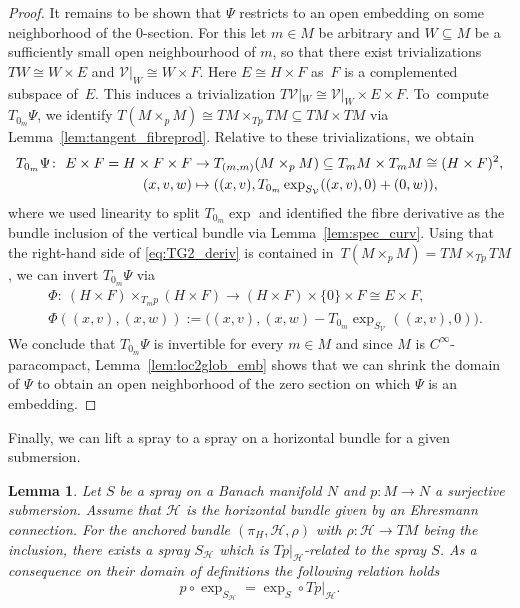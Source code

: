 \documentclass[pdftex]{sigma}
\numberwithin{equation}{section}
\newtheorem{Lemma}[Theorem]{Lemma}
\newcommand{\cH}{\ensuremath{\mathcal{H}}}
\newcommand{\cV}{\ensuremath{\mathcal{V}}}
\begin{document}
\begin{proof}
It remains to be shown that $\Psi$ restricts to an open embedding on some neighborhood of the $0$-section. For this let $m \in M$ be arbitrary and $W \subseteq M$ be a sufficiently small open neighbourhood of $m$, so that there exist trivializations $TW \cong W \times E$ and $\cV|_{W} \cong W \times F$. Here $E \cong H\times F$ as~$F$ is a complemented subspace of~$E$. This induces a trivialization $T\cV|_{W} \cong \cV|_{W} \times E \times F$. To~compute $T_{0_m}\Psi$, we identify $T(M\times_p M)\cong TM\times_{Tp} TM\subseteq TM \times TM$ via Lemma~\ref{lem:tangent_fibreprod}. Relative to these trivializations, we obtain
\begin{align}
 T_{0_{m}}\Psi\colon\ E \times F = H\times F \times F &\rightarrow T_{(m,m)}(M \times_{p} M) \subseteq T_{m}M \times T_{m}M \cong (H\times F)^2, \notag \\
 (x,v,w) &\mapsto ((x,v), T_{0_{m}}\exp_{S_{\cV}}((x,v),0) + (0,w)),\label{eq:TG2_deriv}
\end{align}
where we used linearity to split $T_{0_m}\exp$ and identified the fibre derivative as the bundle inclusion of the vertical bundle via Lemma~\ref{lem:spec_curv}. Using that the right-hand side of \eqref{eq:TG2_deriv} is contained in~${T(M\times_p M)=TM \times_{Tp} TM}$, we can invert $T_{0_m}\Psi$ via
\begin{align*}&\Phi\colon\ (H \times F)\times_{T_mp} (H\times F)\rightarrow (H\times F) \times \{0\} \times F \cong E \times F,\\
&\Phi ((x,v),(x,w)):= \bigl((x,v),(x,w)-T_{0_m}\exp_{S_\cV}((x,v),0)\bigr).
\end{align*}
We conclude that $T_{0_m}\Psi$ is invertible for every $m \in M$ and since $M$ is $C^\infty$-paracompact, Lemma~\ref{lem:loc2glob_emb} shows that we can shrink the domain of $\Psi$ to obtain an open neighborhood of the zero section on which $\Psi$ is an embedding.
\end{proof}


Finally, we can lift a spray to a spray on a horizontal bundle for a given submersion.

\begin{Lemma}\label{lem:spray_lifting}
Let $S$ be a spray on a Banach manifold $N$ and $p \colon M \rightarrow N$ a surjective submersion. Assume that $\cH$ is the horizontal bundle given by an Ehresmann connection. For the anchored bundle $(\pi_H,\cH, \rho)$ with $\rho \colon \cH \rightarrow TM$ being the inclusion, there exists a spray $S_\cH$ which is $Tp|_{\cH}$-related to the spray $S$.
As a consequence on their domain of definitions the following relation holds
\begin{displaymath} p\circ \exp_{S_\cH} = \exp_S \circ Tp|_{\cH}.\end{displaymath}
\end{Lemma}
\end{document}

